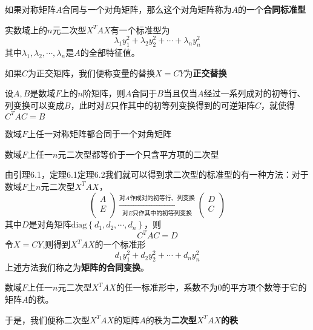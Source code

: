 \documentclass[lang=cn,10pt]{elegantbook}
\begin{document}
如果对称矩阵$A$合同与一个对角矩阵，那么这个对角矩阵称为$A$的一个\textbf{合同标准型}
\begin{proposition}
	实数域上的$n$元二次型$X^{T}AX$有一个标准型为
	\begin{equation}
		\lambda_{1}y^{2}_{1}+\lambda_{2}y^{2}_{2}+\cdots+\lambda_{n}y^{2}_{n}
	\end{equation}
	其中$\lambda_{1},\lambda_{2},\cdots,\lambda_{n}$是$A$的全部特征值。
\end{proposition}
如果$C$为正交矩阵，我们便称变量的替换$X=CY$为\textbf{正交替换}
\begin{lemma}
	设$A,B$是数域$F$上的$n$阶矩阵，则$A$合同于$B$当且仅当$A$经过一系列成对的初等行、列变换可以变成$B$，此时对$E$只作其中的初等列变换得到的可逆矩阵$C$，就使得$C^{T}AC=B$
\end{lemma}
\begin{theorem}
	数域$F$上任一对称矩阵都合同于一个对角矩阵
\end{theorem}
\begin{theorem}
	数域$F$上任一$n$元二次型都等价于一个只含平方项的二次型
\end{theorem}
由引理6.1，定理6.1定理6.2我们就可以得到求二次型的标准型的有一种方法：对于数域$F$上$n$元二次型$X^{T}AX$，
\begin{equation}
	\left( \begin{array}{c}
		A\\
		E\\
	\end{array} \right) \xrightarrow[\text{对}E\text{只作其中的初等列变换}]{\text{对}A\text{作成对的初等行、列变换}}\left( \begin{array}{c}
		D\\
		C\\
	\end{array} \right) 
\end{equation}
其中$D$是对角矩阵$\mathrm{diag}\left\{ d_1,d_2,\cdots ,d_n \right\} $，则
\begin{equation}
	C^{T}AC=D
\end{equation}
令$X=CY$,则得到$X^{T}AX$的一个标准形
\begin{equation}
	d_{1}y^{2}_{1}+d_{2}y^{2}_{2}+\cdots+d_{n}y^{2}_{n}
\end{equation}
上述方法我们称之为\textbf{矩阵的合同变换}。
\begin{proposition}
	数域$F$上任一$n$元二次型$X^{T}AX$的任一标准形中，系数不为0的平方项个数等于它的矩阵$A$的秩。
\end{proposition}
于是，我们便称二次型$X^{T}AX$的矩阵$A$的秩为\textbf{二次型$X^{T}AX$的秩}
\end{document}
